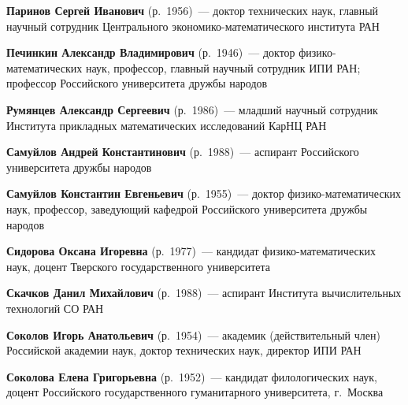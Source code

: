 \begin{multicols}{2}
\vspace*{4pt}

\noindent
\textbf{Паринов Сергей Иванович} (р.\ 1956)~--- доктор технических наук, главный научный
сотрудник Центрального эко\-но\-ми\-ко-ма\-те\-ма\-ти\-че\-ско\-го института РАН

\vspace*{4pt}

\noindent
\textbf{Печинкин Александр Владимирович} (р.\ 1946)~--- доктор физико-математических наук,
профессор, главный научный сотрудник ИПИ РАН; профессор Российского университета
дружбы народов 

\vspace*{4pt}

\noindent
\textbf{Румянцев Александр Сергеевич} (р.\ 1986)~--- младший научный сотрудник 
Института прикладных математических исследований КарНЦ РАН

\vspace*{4pt}

\noindent
\textbf{Самуйлов Андрей Константинович} (р.\ 1988)~--- аспирант Российского университета дружбы народов

\vspace*{4pt}

\noindent
\textbf{Самуйлов Константин Евгеньевич} (р.\ 1955)~--- доктор фи\-зи\-ко-ма\-те\-ма\-ти\-че\-ских 
наук, профессор, за\-ве\-ду\-ющий кафедрой Российского университета дружбы народов

\vspace*{4pt}

\noindent
\textbf{Сидорова Оксана Игоревна} (р.\ 1977)~--- кан\-ди\-дат фи\-зи\-ко-ма\-те\-ма\-ти\-че\-ских 
наук, доцент Тверского государственного университета

\pagebreak



\noindent
\textbf{Скачков Данил Михайлович} (р.\ 1988)~--- 
аспирант Института вычислительных технологий СО РАН


\vspace*{5pt}

\noindent 
\textbf{Соколов Игорь Анатольевич} (р.\ 1954)~---
академик (действительный член) Российской академии наук,
доктор технических наук, директор ИПИ РАН

\vspace*{3pt}

\noindent
\textbf{Соколова Елена Григорьевна} (р.\ 1952)~--- кандидат филологических наук, 
доцент Российского государственного гуманитарного университета, г.~Москва


\end{multicols}
